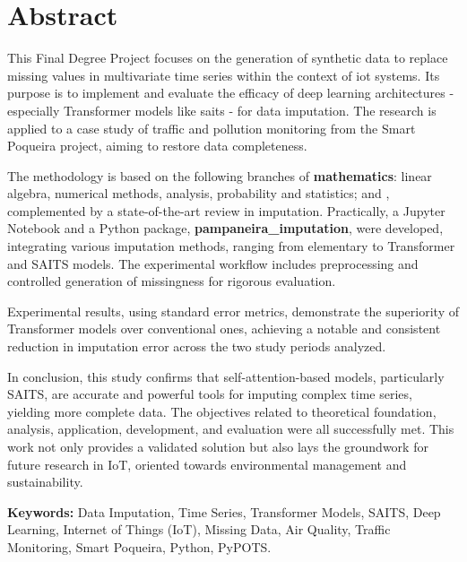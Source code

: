 \chapter*{Abstract}
\label{chap:abstract}

This Final Degree Project focuses on the generation of synthetic data to replace missing values in multivariate time series within the context of \gls{iot} systems. Its purpose is to implement and evaluate the efficacy of deep learning architectures - especially Transformer models like \gls{saits} - for data imputation. The research is applied to a case study of traffic and pollution monitoring from the Smart Poqueira project, aiming to restore data completeness.

The methodology is based on the following branches of \textbf{mathematics}: linear algebra, numerical methods, analysis, probability and statistics; and \textbf{}, complemented by a state-of-the-art review in imputation. Practically, a Jupyter Notebook and a Python package, \textbf{pampaneira\_imputation}, were developed, integrating various imputation methods, ranging from elementary to Transformer and SAITS models. The experimental workflow includes preprocessing and controlled generation of missingness for rigorous evaluation.


Experimental results, using standard error metrics, demonstrate the superiority of Transformer models over conventional ones, achieving a notable and consistent reduction in imputation error across the two study periods analyzed.

In conclusion, this study confirms that self-attention-based models, particularly SAITS, are accurate and powerful tools for imputing complex time series, yielding more complete data. The objectives related to theoretical foundation, analysis, application, development, and evaluation were all successfully met. This work not only provides a validated solution but also lays the groundwork for future research in IoT, oriented towards environmental management and sustainability.

\vspace*{\fill}

\textbf{Keywords:} Data Imputation, Time Series, Transformer Models, SAITS, Deep Learning, Internet of Things (IoT), Missing Data, Air Quality, Traffic Monitoring, Smart Poqueira, Python, PyPOTS.
\newpage %
